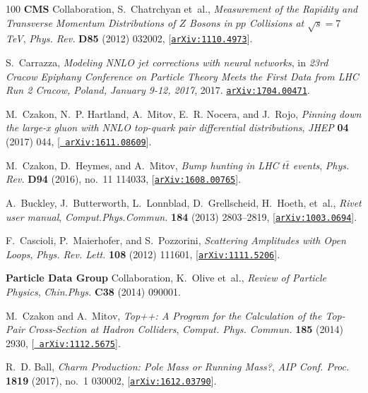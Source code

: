 \begin{thebibliography}{100}
{\bf CMS} Collaboration, S.~Chatrchyan et~al., {\it {Measurement of the
  Rapidity and Transverse Momentum Distributions of $Z$ Bosons in $pp$
  Collisions at $\sqrt{s}=7$ TeV}},  {\em Phys. Rev.} {\bf D85} (2012) 032002,
  [\href{http://arxiv.org/abs/1110.4973}{{\tt arXiv:1110.4973}}].

S.~Carrazza, {\it {Modeling NNLO jet corrections with neural networks}},  in
  {\em {23rd Cracow Epiphany Conference on Particle Theory Meets the First Data
  from LHC Run 2 Cracow, Poland, January 9-12, 2017}}, 2017.
\newblock \href{http://arxiv.org/abs/1704.00471}{{\tt arXiv:1704.00471}}.

M.~Czakon, N.~P. Hartland, A.~Mitov, E.~R. Nocera, and J.~Rojo, {\it {Pinning
  down the large-x gluon with NNLO top-quark pair differential distributions}},
   {\em JHEP} {\bf 04} (2017) 044, [\href{http://arxiv.org/abs/1611.08609}{{\tt
  arXiv:1611.08609}}].

M.~Czakon, D.~Heymes, and A.~Mitov, {\it {Bump hunting in LHC $t\bar t$
  events}},  {\em Phys. Rev.} {\bf D94} (2016), no.~11 114033,
  [\href{http://arxiv.org/abs/1608.00765}{{\tt arXiv:1608.00765}}].

A.~Buckley, J.~Butterworth, L.~Lonnblad, D.~Grellscheid, H.~Hoeth, et~al., {\it
  {Rivet user manual}},  {\em Comput.Phys.Commun.} {\bf 184} (2013) 2803--2819,
  [\href{http://arxiv.org/abs/1003.0694}{{\tt arXiv:1003.0694}}].

F.~Cascioli, P.~Maierhofer, and S.~Pozzorini, {\it {Scattering Amplitudes with
  Open Loops}},  {\em Phys. Rev. Lett.} {\bf 108} (2012) 111601,
  [\href{http://arxiv.org/abs/1111.5206}{{\tt arXiv:1111.5206}}].

{\bf Particle Data Group} Collaboration, K.~Olive et~al., {\it {Review of
  Particle Physics}},  {\em Chin.Phys.} {\bf C38} (2014) 090001.

M.~Czakon and A.~Mitov, {\it {Top++: A Program for the Calculation of the
  Top-Pair Cross-Section at Hadron Colliders}},  {\em Comput. Phys. Commun.}
  {\bf 185} (2014) 2930, [\href{http://arxiv.org/abs/1112.5675}{{\tt
  arXiv:1112.5675}}].

R.~D. Ball, {\it {Charm Production: Pole Mass or Running Mass?}},  {\em AIP
  Conf. Proc.} {\bf 1819} (2017), no.~1 030002,
  [\href{http://arxiv.org/abs/1612.03790}{{\tt arXiv:1612.03790}}].


\end{thebibliography}
